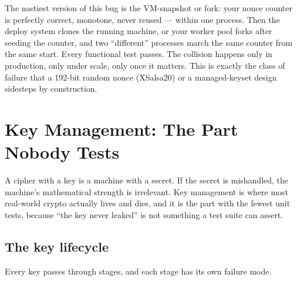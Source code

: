 \begin{trapbox}
The nastiest version of this bug is the VM-snapshot or fork: your nonce counter is
perfectly correct, monotone, never reused --- within one process. Then the deploy
system clones the running machine, or your worker pool forks after seeding the
counter, and two ``different'' processes march the same counter from the same
start. Every functional test passes. The collision happens only in production,
only under scale, only once it matters. This is exactly the class of failure that
a 192-bit random nonce (XSalsa20) or a managed-keyset design sidesteps by
construction.
\end{trapbox}

\section{Key Management: The Part Nobody Tests}
\label{ch39:keymgmt}

A cipher with a key is a machine with a secret. If the secret is mishandled, the
machine's mathematical strength is irrelevant. Key management is where most
real-world crypto actually lives and dies, and it is the part with the fewest unit
tests, because ``the key never leaked'' is not something a test suite can assert.

\subsection{The key lifecycle}

Every key passes through stages, and each stage has its own failure mode.

\begin{center}
\end{center}

